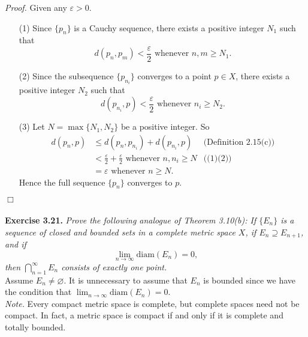 \documentclass{article}
\begin{document}
\emph{Proof.}
Given any $\varepsilon > 0$.
\begin{enumerate}
\item[(1)]
Since $\{p_n\}$ is a Cauchy sequence, there exists a positive integer $N_1$ such that
$$d(p_n,p_m) < \frac{\varepsilon}{2} \text{ whenever } n, m \geq N_1.$$
\item[(2)]
Since the subsequence $\{p_{n_i}\}$ converges to a point $p \in X$,
there exists a positive integer $N_2$ such that
$$d(p_{n_i},p) < \frac{\varepsilon}{2} \text{ whenever } n_i \geq N_2.$$
\item[(3)]
Let $N = \max\{N_1, N_2\}$ be a positive integer.
So
\begin{align*}
d(p_n,p)
&\leq d(p_n,p_{n_i}) + d(p_{n_i}, p)
  &\text{(Definition 2.15(c))} \\
&< \frac{\varepsilon}{2} + \frac{\varepsilon}{2} \text{ whenever } n, n_i \geq N
  &\text{((1)(2))} \\
&= \varepsilon \text{ whenever } n \geq N.
\end{align*}
Hence the full sequence $\{p_n\}$ converges to $p$.
\end{enumerate}
$\Box$ \\\\






\textbf{Exercise 3.21.}
\emph{Prove the following analogue of Theorem 3.10(b):
If $\{E_n\}$ is a sequence of closed and bounded sets in a complete metric space $X$,
if $E_n \supseteq E_{n+1}$, and if
$$\lim_{n \to \infty} \mathrm{diam}(E_n) = 0,$$
then $\bigcap_{n=1}^{\infty} E_n$ consists of exactly one point.} \\

Assume $E_n \neq \varnothing$. It is unnecessary to assume that $E_n$ is bounded
since we have the condition that $\lim_{n \to \infty} \mathrm{diam}(E_n) = 0$.\\

\emph{Note.}
Every compact metric space is complete, but complete spaces need not be compact.
In fact, a metric space is compact if and only if it is complete and totally bounded. \\
\end{document}
